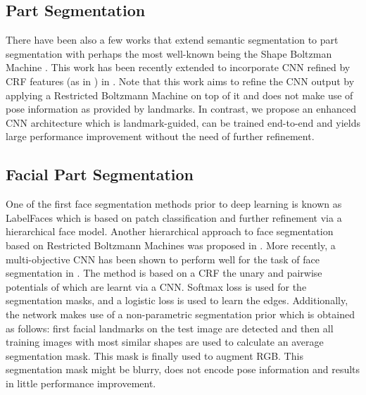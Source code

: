 \subsection{Part Segmentation}

There have been also a few works that
extend semantic segmentation to part segmentation with perhaps the
most well-known being the Shape Boltzman Machine
\cite{eslami2012generative,eslami2014shape}. This work has been
recently extended to incorporate CNN refined by CRF features (as in
\cite{chen2015semantic}) in \cite{tsogkas2015deep}. Note that this
work aims to refine the CNN output by applying a Restricted Boltzmann
Machine on top of it and does not make use of pose information as
provided by landmarks. In contrast, we propose an enhanced CNN
architecture which is landmark-guided, can be trained end-to-end and
yields large performance improvement without the need of further
refinement.


\subsection{Facial Part Segmentation}

One of the first face segmentation methods
prior to deep learning is known as LabelFaces
\cite{warrell2009labelfaces} which is based on patch classification
and further refinement via a hierarchical face model. Another
hierarchical approach to face segmentation based on Restricted
Boltzmann Machines was proposed in \cite{luo2012hierarchical}. More
recently, a multi-objective CNN has been shown to perform well for the
task of face segmentation in \cite{liu2015multi}. The method is based
on a CRF the unary and pairwise potentials of which are learnt via a
CNN. Softmax loss is used for the segmentation masks, and a logistic
loss is used to learn the edges. Additionally, the network makes use
of a non-parametric segmentation prior which is obtained as follows:
first facial landmarks on the test image are detected and then all
training images with most similar shapes are used to calculate an
average segmentation mask. This mask is finally used to augment
RGB. This segmentation mask might be blurry, does not encode pose
information and results in little performance improvement.











